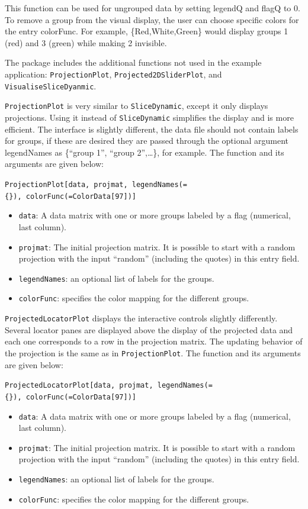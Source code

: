 \documentclass[]{interact}
\theoremstyle{plain}%
\theoremstyle{definition}
\theoremstyle{remark}
\providecommand{\tightlist}{%
  \setlength{\itemsep}{0pt}\setlength{\parskip}{0pt}}
\def\tightlist{}
\begin{document}
This function can be used for ungrouped data by setting legendQ and
flagQ to 0. To remove a group from the visual display, the user can
choose specific colors for the entry colorFunc. For example,
\{Red,White,Green\} would display groups 1 (red) and 3 (green) while
making 2 invisible.

The package includes the additional functions not used in the example
application: \texttt{ProjectionPlot}, \texttt{Projected2DSliderPlot},
and \texttt{VisualiseSliceDyanmic}.

\texttt{ProjectionPlot} is very similar to \texttt{SliceDynamic}, except
it only displays projections. Using it instead of \texttt{SliceDynamic}
simplifies the display and is more efficient. The interface is slightly
different, the data file should not contain labels for groups, if these
are desired they are passed through the optional argument legendNames as
\{``group 1'', ``group 2'',\ldots\}, for example. The function and its
arguments are given below:

\texttt{ProjectionPlot{[}data,\ projmat,\ legendNames(=\{\}),\ colorFunc(=ColorData{[}97{]}){]}}

\begin{itemize}
\tightlist
\item
  \texttt{data}: A data matrix with one or more groups labeled by a flag
  (numerical, last column).
\item
  \texttt{projmat}: The initial projection matrix. It is possible to
  start with a random projection with the input ``random'' (including
  the quotes) in this entry field.
\item
  \texttt{legendNames}: an optional list of labels for the groups.
\item
  \texttt{colorFunc}: specifies the color mapping for the different
  groups.
\end{itemize}

\texttt{ProjectedLocatorPlot} displays the interactive controls slightly
differently. Several locator panes are displayed above the display of
the projected data and each one corresponds to a row in the projection
matrix. The updating behavior of the projection is the same as in
\texttt{ProjectionPlot}. The function and its arguments are given below:

\texttt{ProjectedLocatorPlot{[}data,\ projmat,\ legendNames(=\{\}),\ colorFunc(=ColorData{[}97{]}){]}}

\begin{itemize}
\tightlist
\item
  \texttt{data}: A data matrix with one or more groups labeled by a flag
  (numerical, last column).
\item
  \texttt{projmat}: The initial projection matrix. It is possible to
  start with a random projection with the input ``random'' (including
  the quotes) in this entry field.
\item
  \texttt{legendNames}: an optional list of labels for the groups.
\item
  \texttt{colorFunc}: specifies the color mapping for the different
  groups.
\end{itemize}
\end{document}
